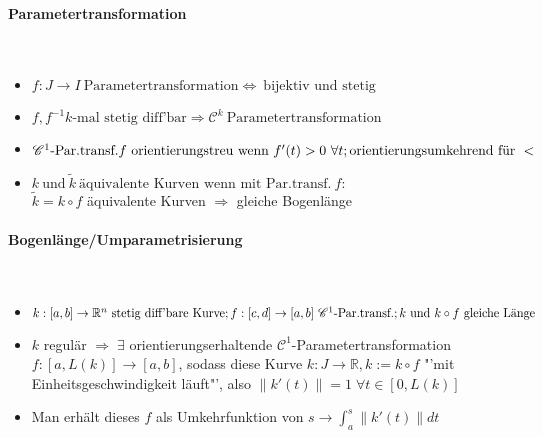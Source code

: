 \documentclass[paper=a3,paper=landscape, fontsize=9pt, DIV=30]{scrartcl}
\newcommand{\real}{{\mathbb{R}}}
\begin{document}
\begin{multicols*}{4}
  \paragraph{Parametertransformation}\hspace{0pt} \\
  \begin{itemize}
  	\item $f: J \rightarrow I \ \text{Parametertransformation} \Leftrightarrow \ \text{bijektiv und stetig}$
  	\item $f, f^{-1} k\text{-mal stetig diff'bar} \Rightarrow \mathscr{C}^k \ \text{Parametertransformation}$
  	\item $\mathscr{C}^1 \text{-Par.transf.} f \ \text{orientierungstreu wenn} \ f'(t) > 0 \ \forall t; \\ \text{orientierungsumkehrend für} \ <$
  	\item $ k \ \text{und}\ \tilde{k} \ \text{äquivalente Kurven wenn mit Par.transf.}\ f:$\\ $\tilde{k} = k \circ f$ äquivalente Kurven $\Rightarrow$ gleiche Bogenlänge
  \end{itemize}

  \paragraph{Bogenlänge/Umparametrisierung}\hspace{0pt} \\
\begin{itemize}
	\item   $k: [a,b] \rightarrow \real^n \ \text{stetig diff'bare Kurve};\\ f:[c,d] \rightarrow [a,b] \ \mathscr{C}^1\text{-Par.transf.}; k \ \text{und}\ k \circ f \ \text{gleiche Länge} $
	\item $k$ regulär $\Rightarrow\;\exists$ orientierungserhaltende $\mathscr{C}^1$-Parametertransformation $f : [a,L(k)] \rightarrow [a,b]$, sodass diese Kurve $k: J \rightarrow \real, k := k \circ f$ "'mit Einheitsgeschwindigkeit läuft"', also $\lVert k'(t) \rVert = 1 \; \forall t \in [0,L(k)]$
	\item Man erhält dieses $f$ als Umkehrfunktion von $s \rightarrow \int_{a}^{s} \lVert k'(t)\rVert dt$
\end{itemize}


\end{multicols*}
\end{document}
